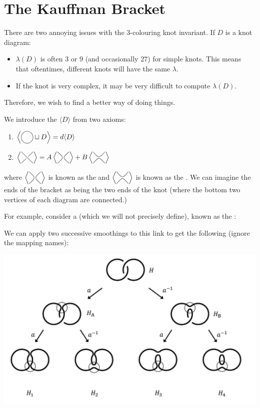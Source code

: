 \documentclass{article}
\begin{document}
\section{The Kauffman Bracket}
There are two annoying issues with the 3-colouring knot invariant. If $D$ is a knot diagram:
\begin{itemize}
    \item $\lambda(D)$ is often $3$ or $9$ (and occasionally $27$) for simple knots. This means that oftentimes, different knots will have the same $\lambda$.
    \item If the knot is very complex, it may be very difficult to compute $\lambda(D).$
\end{itemize}
Therefore, we wish to find a better way of doing things.
\begin{definition}
    We introduce the  $\langle D\rangle$ from two axioms:
    \begin{enumerate}
        \item $\left\langle\KPA \sqcup D \right\rangle=d\langle D\rangle$
        
        \item $\left\langle\KPB\right\rangle=
        A\left\langle\KPD\right\rangle + B \left\langle \KPC \right\rangle$
    \end{enumerate}
    where $\left\langle\KPD\right\rangle$ is known as the  and $\left\langle \KPC\right\rangle$ is known as the . We can imagine the ends of the bracket as being the two ends of the knot (where the bottom two vertices of each diagram are connected.)
\end{definition}
For example, consider a  (which we will not precisely define), known as the :
\begin{center}
\end{center}
We can apply two successive smoothings to this link to get the following (ignore the mapping names):
\begin{center}
    \includegraphics[width=0.5\linewidth]{figures/hopf_link_bracket.png}
\end{center}
\end{document}
